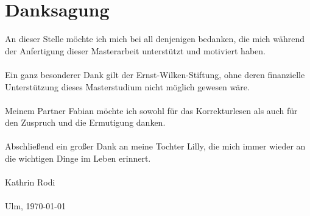\documentclass[
    12pt, %
    DIV10,
    ngerman, %
    a4paper, %
    oneside, %
    titlepage, %
    parskip=half, %
    headings=normal, %
    listof=totoc, %
    bibliography=totoc, %
    index=totoc, %
    captions=tableheading, %
    final %
]{scrreprt}
\begin{document}
\newpage
\chapter*{Danksagung}
An dieser Stelle möchte ich mich bei all denjenigen bedanken, die mich während der Anfertigung dieser Masterarbeit unterstützt und motiviert haben.\\\\
Ein ganz besonderer Dank gilt der Ernst-Wilken-Stiftung, ohne deren finanzielle Unterstützung dieses Masterstudium nicht möglich gewesen wäre.\\\\
Meinem Partner Fabian möchte ich sowohl für das Korrekturlesen als auch für den Zuspruch und die Ermutigung danken.\\\\
Abschlie{\ss}end ein gro{\ss}er Dank an meine Tochter Lilly, die mich immer wieder an die wichtigen Dinge im Leben erinnert.\\\\
Kathrin Rodi\\\\

Ulm, \today

\newpage


\tableofcontents

\end{document}
